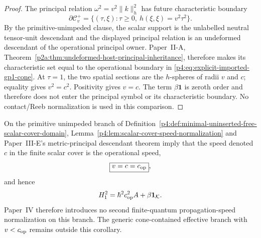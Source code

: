 \documentclass[12pt,a4paper]{article}
\begin{document}
\begin{proof}
The principal relation
\(
\omega^2=v^2\lVert k\rVert_h^2
\)
has future characteristic boundary
\[
 \partial\mathcal C_v^+
 =
 \{(\tau,\xi):\tau\ge0,\ h(\xi,\xi)=v^2\tau^2\}.
\]
By the primitive-unimpeded clause, the scalar support is the unlabelled neutral
tensor-unit descendant and the displayed principal relation is an undeformed
descendant of the operational principal owner.  Paper~II-A,
Theorem~\ref{p2a:thm:undeformed-host-principal-inheritance}, therefore makes
its characteristic set equal to the operational boundary in
\eqref{p4:eq:explicit-imported-gp1-cone}.  At \(\tau=1\), the two spatial
sections are the \(h\)-spheres of radii \(v\) and \(c\); equality gives
\(v^2=c^2\).  Positivity gives \(v=c\).
The term \(\beta\mathbf1\) is zeroth order and therefore does not enter the
principal symbol or its characteristic boundary.  No contact/Reeb
normalization is used in this comparison.
\end{proof}


\begin{corollary}
\label{p4:cor:finite-inherited-operational-speed}
On the primitive unimpeded branch of
Definition~\ref{p4:def:minimal-uninserted-free-scalar-cover-domain},
Lemma~\ref{p4:lem:scalar-cover-speed-normalization} and Paper~III-E's
metric-principal descendant theorem imply that the speed denoted \(c\) in the
finite scalar cover is the operational speed,
\[
 \boxed{v=c=c_{\rm op}},
\]
and hence
\[
 H_1^2=\hbar^2c_{\rm op}^2A+\beta\mathbf1_{\mathcal K}.
\]
Paper~IV therefore introduces no second finite-quantum propagation-speed
normalization on this branch.  The generic cone-contained effective branch
with \(v<c_{\rm op}\) remains outside this corollary.
\end{corollary}
\end{document}
